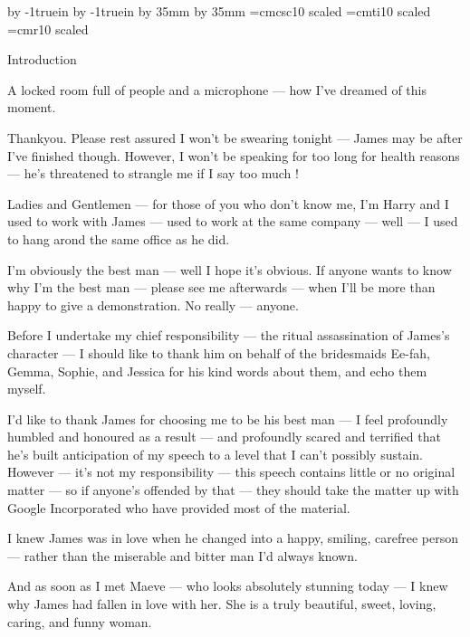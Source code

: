 %
%                                                                                                                        
\hsize=140mm
\vsize=227mm
\advance\voffset by -1truein
\advance\hoffset by -1truein
\advance\voffset by 35mm
\advance\hoffset by 35mm
%
\baselineskip=16pt
\parindent=0pt
\parskip=12pt
%
\font\headfont=cmcsc10 scaled 
\def\heading#1{\centerline{\headfont#1}}
\font\notefont=cmti10 scaled 
\font\bodyfont=cmr10 scaled 
\bodyfont

\heading{Introduction}

{\notefont A locked room full of people and a microphone --- how I've
dreamed of this moment.}

Thankyou. Please rest assured I won't be swearing tonight --- James
may be after I've finished though. However, I won't be speaking for
too long for health reasons --- he's threatened to strangle me if I
say too much !

Ladies and Gentlemen --- for those of you who don't know me, I'm Harry
and I used to work with James --- used to work at the same company ---
well --- I used to hang arond the same office as he did.

I'm obviously the best man --- well I hope it's obvious. If anyone
wants to know why I'm the best man --- please see me afterwards ---
when I'll be more than happy to give a demonstration. No really ---
anyone.

Before I undertake my chief responsibility --- the ritual
assassination of James's character --- I should like to thank him on
behalf of the bridesmaids Ee-fah, Gemma, Sophie, and Jessica for his
kind words about them, and echo them myself.

I'd like to thank James for choosing me to be his best man --- I feel
profoundly humbled and honoured as a result --- and profoundly scared
and terrified that he's built anticipation of my speech to a level
that I can't possibly sustain. However --- it's not my responsibility
--- this speech contains little or no original matter --- so if
anyone's offended by that --- they should take the matter up with
Google Incorporated who have provided most of the material.

I knew James was in love when he changed into a happy, smiling,
carefree person --- rather than the miserable and bitter man I'd
always known.

And as soon as I met Maeve --- who looks absolutely stunning today ---
I knew why James had fallen in love with her. She is a truly
beautiful, sweet, loving, caring, and funny woman.

